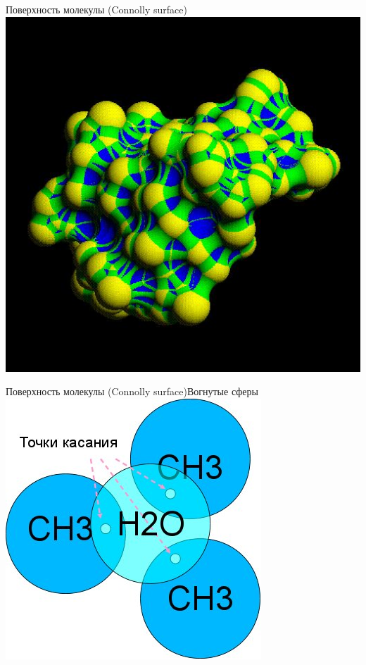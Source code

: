 \documentclass{beamer}
\begin{document}
    \begin{frame}{Поверхность молекулы (Connolly surface)}
        \includegraphics[width=\linewidth]{connolly-types.jpg}
    \end{frame}

    \begin{frame}{Поверхность молекулы (Connolly surface)}{Вогнутые сферы}
        \includegraphics[width=\linewidth]{connolly-3-points.jpg}
    \end{frame}
\end{document}
